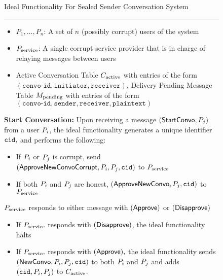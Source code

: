 
\begin{figure*}
	\centering
	\begin{tcolorbox}[enhanced,sharp corners,colback=white,boxrule=0.3mm,left=1mm]
	\footnotesize
		\vspace{0.5\baselineskip}
		Ideal Functionality For Sealed Sender Conversation System
		
		
		\vspace{0.5\baselineskip}
		\hrule 
		\vspace{0.5\baselineskip}
	\begin{itemize}
		\item $P_1, \ldots, P_n$: A set of $n$ (possibly corrupt) users of the system
		\item $P_{\text{service}}$: A single corrupt service provider that is in charge of relaying messages between users
		\item Active Conversation Table $C_{\text{active}}$ with entries of the form $(\texttt{convo-id}, \texttt{initiator}, \texttt{receiver})$, Delivery Pending Message Table $M_{\text{pending}}$ with entries of the form $(\texttt{convo-id}, \texttt{sender}, \texttt{receiver}, \texttt{plaintext})$
	\end{itemize}

		\medskip
		{\bf Start Conversation:} Upon receiving a message $(\mathsf{StartConvo}, P_j)$ from a user $P_i$, the ideal functionality generates a unique identifier $\mathtt{cid},$ and performs the following: 
			\begin{itemize}
				\item If $P_i$ or $P_j$ is corrupt, send $(\mathsf{ApproveNewConvoCorrupt}, P_i, P_j, \mathtt{cid})$ to $P_{\text{service}}$
				\item If both $P_i$ and $P_j$ are honest, $(\mathsf{ApproveNewConvo}, P_j, \mathtt{cid})$ to $P_{\text{service}}$
			\end{itemize}
		$P_{\text{service}}$ responds to either message with $(\mathsf{Approve})$ or $(\mathsf{Disapprove})$
			\begin{itemize}
				\item If  $P_{\text{service}}$ responds with $(\mathsf{Disapprove})$, the ideal functionality halts
				\item If $P_{\text{service}}$ responds with $(\mathsf{Approve}),$ the ideal functionality sends $(\mathsf{NewConvo}, P_i, P_j, \mathtt{cid})$ to both $P_i$ and $P_j$ and adds $(\mathtt{cid}, P_i, P_j)$ to $C_{\text{active}}$.
			\end{itemize}


\end{tcolorbox}
\end{figure*}

